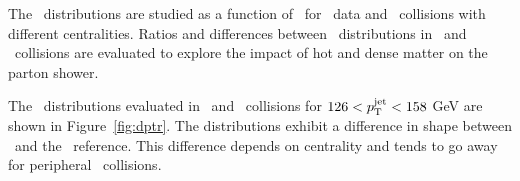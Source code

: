 
The \Dptr\ distributions are studied as a function of \ptjet\ for \pp\ data and \PbPb\ collisions with different centralities. Ratios and differences between \Dptr\ distributions in \pbpb\ and \pp\ collisions are evaluated to explore the impact of hot and dense matter on the parton shower.

The \Dptr\ distributions evaluated in \pp\ and \pbpb\ collisions for $126 < \mbox{$p_{\mathrm{T}}^{\mathrm{jet}}$} < 158$ GeV are shown in Figure~\ref{fig:dptr}. The distributions exhibit a difference in shape between \PbPb\ and the \pp\ reference. This difference depends on centrality and tends to go away for peripheral \pbpb\ collisions.


